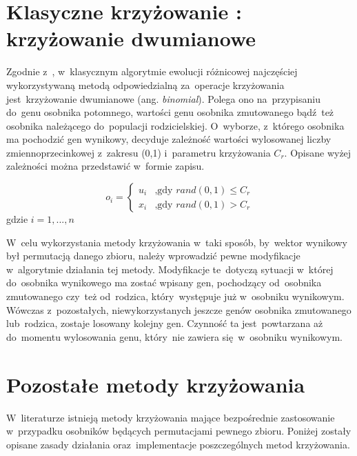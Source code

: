 
\section{Klasyczne krzyżowanie : krzyżowanie dwumianowe}\label{sec:strukturaDokumentu}

Zgodnie z~\cite{doktorat}, \cite{diff2} w~klasycznym algorytmie ewolucji różnicowej najczęściej wykorzystywaną metodą odpowiedzialną za~operacje krzyżowania jest~krzyżowanie dwumianowe (ang. \textit{binomial}). Polega ono na~przypisaniu do~genu osobnika potomnego, wartości genu osobnika zmutowanego bądź~też osobnika należącego do~populacji rodzicielskiej. O~wyborze, z~którego osobnika ma pochodzić gen wynikowy, decyduje zależność wartości wylosowanej liczby zmiennoprzecinkowej z~zakresu (0,1) i~parametru krzyżowania $C_{r}$. Opisane wyżej zależności można przedstawić w~formie zapisu.

\begin{equation}
o_{i} = \left\{ \begin{array}{ll}
u_{i} & \textrm{,gdy $rand(0,1) \le C_{r}$}\\
x_{i} & \textrm{,gdy $rand(0,1) > C_{r}$}
\end{array} \right.
\end{equation}
gdzie $i = 1,...,n$
 
W~celu wykorzystania metody krzyżowania w~taki sposób, by~wektor wynikowy był permutacją danego zbioru, należy wprowadzić pewne modyfikacje w~algorytmie działania tej metody. Modyfikacje te~dotyczą sytuacji w~której do~osobnika wynikowego ma zostać wpisany gen, pochodzący od~osobnika zmutowanego czy~też od~rodzica, który~występuje już w~osobniku wynikowym. Wówczas z~pozostałych, niewykorzystanych jeszcze genów osobnika zmutowanego lub~rodzica, zostaje losowany kolejny gen. Czynność ta jest~powtarzana aż do~momentu wylosowania genu, który~nie zawiera się~w~osobniku wynikowym.

\section{Pozostałe metody krzyżowania}\label{sec:strukturaDokumentu}

W~literaturze \cite{crossovers} istnieją metody krzyżowania mające bezpośrednie zastosowanie w~przypadku osobników będących permutacjami pewnego zbioru. Poniżej zostały opisane zasady działania oraz~implementacje poszczególnych metod krzyżowania.

